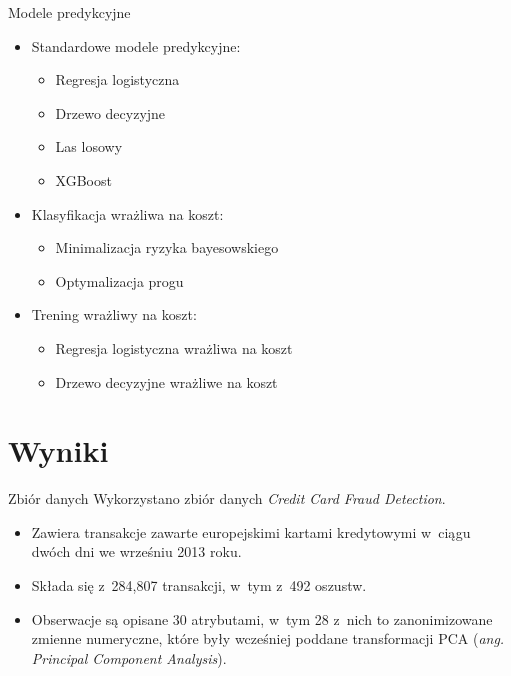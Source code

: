 \documentclass{beamer}
\begin{document}
\begin{frame}{Modele predykcyjne}
	\begin{itemize}
		\item Standardowe modele predykcyjne:
		\begin{itemize}
			\item Regresja logistyczna
			\item Drzewo decyzyjne
			\item Las losowy
			\item XGBoost
		\end{itemize}
		\item Klasyfikacja wrażliwa na koszt:
		\begin{itemize}
			\item Minimalizacja ryzyka bayesowskiego
			\item Optymalizacja progu
		\end{itemize}
		\item Trening wrażliwy na koszt:
		\begin{itemize}
			\item Regresja logistyczna wrażliwa na koszt
			\item Drzewo decyzyjne wrażliwe na koszt
		\end{itemize}
	\end{itemize}
\end{frame}

\section{Wyniki}

\begin{frame}{Zbiór danych}
	Wykorzystano zbiór danych \emph{Credit Card Fraud Detection}.
	\begin{itemize}
		\item Zawiera transakcje zawarte europejskimi kartami kredytowymi w~ciągu dwóch dni we wrześniu 2013 roku.
		\item Składa się z~284,807 transakcji, w~tym z~492 oszustw.
		\item Obserwacje są opisane 30 atrybutami, w~tym 28 z~nich to zanonimizowane zmienne numeryczne, które były wcześniej poddane transformacji PCA (\textit{ang. Principal Component Analysis}).
	\end{itemize}
\end{frame}
\end{document}
